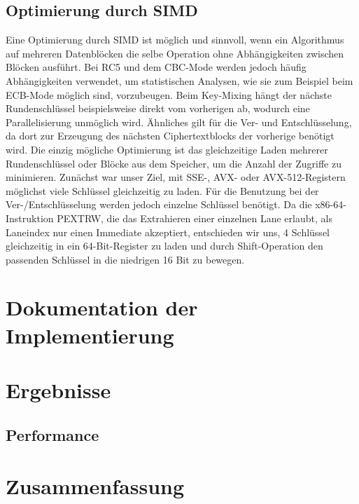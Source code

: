 \documentclass[course=erap]{aspdoc}
\begin{document}
\subsection{Optimierung durch SIMD}
Eine Optimierung durch SIMD ist möglich und sinnvoll, wenn ein Algorithmus auf mehreren Datenblöcken die selbe Operation ohne Abhängigkeiten zwischen Blöcken ausführt. Bei RC5 und dem CBC-Mode werden jedoch häufig Abhängigkeiten verwendet, um statistischen Analysen, wie sie zum Beispiel beim ECB-Mode möglich sind, vorzubeugen.
Beim Key-Mixing hängt der nächste Rundenschlüssel beispielsweise direkt vom vorherigen ab, wodurch eine Parallelisierung unmöglich wird.
Ähnliches gilt für die Ver- und Entschlüsselung, da dort zur Erzeugung des nächsten Ciphertextblocks der vorherige benötigt wird.
Die einzig mögliche Optimierung ist das gleichzeitige Laden mehrerer Rundenschlüssel oder Blöcke aus dem Speicher, um die Anzahl der Zugriffe zu minimieren. Zunächst war unser Ziel, mit SSE-, AVX- oder AVX-512-Registern möglichst viele Schlüssel gleichzeitig zu laden. Für die Benutzung bei der Ver-/Entschlüsselung werden jedoch einzelne Schlüssel benötigt. Da die x86-64-Instruktion PEXTRW, die das Extrahieren einer einzelnen Lane erlaubt, als Laneindex nur einen Immediate akzeptiert, entschieden wir uns, 4 Schlüssel gleichzeitig in ein 64-Bit-Register zu laden und durch Shift-Operation den passenden Schlüssel in die niedrigen 16 Bit zu bewegen.

\section{Dokumentation der Implementierung}


\section{Ergebnisse}



\subsection{Performance}

\section{Zusammenfassung}

\printbibliography
\end{document}
